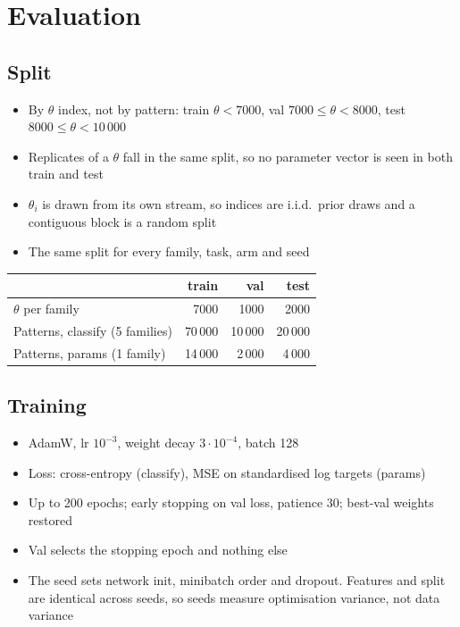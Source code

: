 \documentclass[11pt]{article}
\begin{document}
\section{Evaluation}

\subsection*{Split}
\begin{itemize}
  \item By $\theta$ index, not by pattern: train $\theta<7000$, val $7000\le\theta<8000$, test $8000\le\theta<10\,000$
  \item Replicates of a $\theta$ fall in the same split, so no parameter vector is seen in both train and test
  \item $\theta_i$ is drawn from its own stream, so indices are i.i.d.\ prior draws and a contiguous block is a random split
  \item The same split for every family, task, arm and seed
\end{itemize}

\smallskip
\begin{tabular}{@{}lrrr@{}}
\toprule
 & train & val & test \\
\midrule
$\theta$ per family & 7000 & 1000 & 2000 \\
Patterns, classify (5 families) & 70\,000 & 10\,000 & 20\,000 \\
Patterns, params (1 family) & 14\,000 & 2\,000 & 4\,000 \\
\bottomrule
\end{tabular}

\subsection*{Training}
\begin{itemize}
  \item AdamW, lr $10^{-3}$, weight decay $3\cdot10^{-4}$, batch 128
  \item Loss: cross-entropy (classify), MSE on standardised log targets (params)
  \item Up to 200 epochs; early stopping on val loss, patience 30; best-val weights restored
  \item Val selects the stopping epoch and nothing else
  \item The seed sets network init, minibatch order and dropout. Features and split are identical across seeds, so seeds measure optimisation variance, not data variance
\end{itemize}
\end{document}
